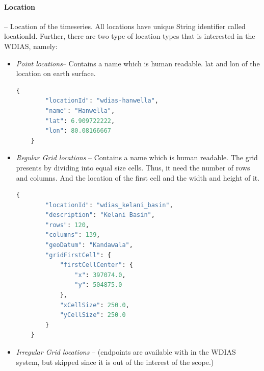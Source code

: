 \paragraph{Location}-- Location of the timeseries. All locations have unique String identifier called locationId. Further, there are two type of location types that is interested in the WDIAS, namely:
\begin{itemize}
  \item \emph{Point locations}-- Contains a name which is human readable. lat and lon of the location on earth surface.
  \begin{lstlisting}[language=Python]
    {
        "locationId": "wdias-hanwella",
        "name": "Hanwella",
        "lat": 6.909722222,
        "lon": 80.08166667
    }
  \end{lstlisting}
  \item \emph{Regular Grid locations} -- Contains a name which is human readable. The grid presents by dividing into equal size cells. Thus, it need the number of rows and columns. 
  And the location of the first cell and the width and height of it.
  \begin{lstlisting}[language=Python]
      {
        "locationId": "wdias_kelani_basin",
        "description": "Kelani Basin",
        "rows": 120,
        "columns": 139,
        "geoDatum": "Kandawala",
        "gridFirstCell": {
            "firstCellCenter": {
                "x": 397074.0,
                "y": 504875.0
            },
            "xCellSize": 250.0,
            "yCellSize": 250.0
        }
    }
  \end{lstlisting}
  \item \emph{Irregular Grid locations} -- (endpoints are available with in the WDIAS system, but skipped since it is out of the interest of the scope.)
\end{itemize}

